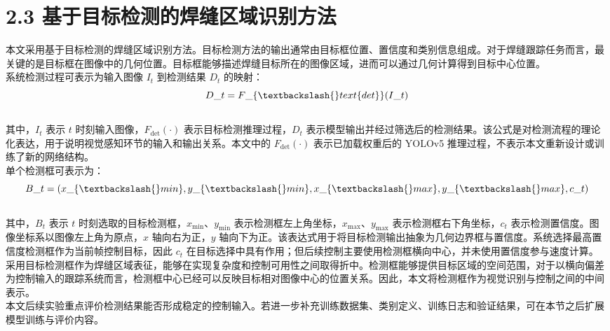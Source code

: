 \documentclass[UTF8,a4paper,12pt]{ctexrep}
\begin{document}
\section{2.3 基于目标检测的焊缝区域识别方法}

本文采用基于目标检测的焊缝区域识别方法。目标检测方法的输出通常由目标框位置、置信度和类别信息组成。对于焊缝跟踪任务而言，最关键的是目标框在图像中的几何位置。目标框能够描述焊缝目标所在的图像区域，进而可以通过几何计算得到目标中心位置。\\

系统检测过程可表示为输入图像 $I_t$ 到检测结果 $D_t$ 的映射：\\

$$\\
D\_t = F\_\{\textbackslash\{\}text\{det\}\}(I\_t)\\
$$\\

其中，$I_t$ 表示 $t$ 时刻输入图像，$F_{\text{det}}(\cdot)$ 表示目标检测推理过程，$D_t$ 表示模型输出并经过筛选后的检测结果。该公式是对检测流程的理论化表达，用于说明视觉感知环节的输入和输出关系。本文中的 $F_{\text{det}}(\cdot)$ 表示已加载权重后的 YOLOv5 推理过程，不表示本文重新设计或训练了新的网络结构。\\

单个检测框可表示为：\\

$$\\
B\_t = (x\_\{\textbackslash\{\}min\},y\_\{\textbackslash\{\}min\},x\_\{\textbackslash\{\}max\},y\_\{\textbackslash\{\}max\},c\_t)\\
$$\\

其中，$B_t$ 表示 $t$ 时刻选取的目标检测框，$x_{\min}$、$y_{\min}$ 表示检测框左上角坐标，$x_{\max}$、$y_{\max}$ 表示检测框右下角坐标，$c_t$ 表示检测置信度。图像坐标系以图像左上角为原点，$x$ 轴向右为正，$y$ 轴向下为正。该表达式用于将目标检测输出抽象为几何边界框与置信度。系统选择最高置信度检测框作为当前帧控制目标，因此 $c_t$ 在目标选择中具有作用；但后续控制主要使用检测框横向中心，并未使用置信度参与速度计算。\\

采用目标检测框作为焊缝区域表征，能够在实现复杂度和控制可用性之间取得折中。检测框能够提供目标区域的空间范围，对于以横向偏差为控制输入的跟踪系统而言，检测框中心已经可以反映目标相对图像中心的位置关系。因此，本文将检测框作为视觉识别与控制之间的中间表示。\\

本文后续实验重点评价检测结果能否形成稳定的控制输入。若进一步补充训练数据集、类别定义、训练日志和验证结果，可在本节之后扩展模型训练与评价内容。\\
\end{document}

